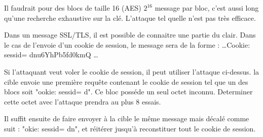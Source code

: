 Il faudrait pour des blocs de taille 16 (AES) $2^{16}$ message par bloc, c'est aussi long qu'une recherche 
exhaustive sur la clé. L'attaque tel quelle n'est pas très efficace. 

Dans un message SSL/TLS, il est possible de connaitre une partie du clair. Dans le cas de l'envoie d'un cookie de 
session, le message sera de la forme : \dots Cookie: sessid= dnu6YhPb5fd0kmQ \dots

Si l'attaquant veut voler le cookie de session, il peut utiliser l'attaque ci-dessus. la cible envoie une première
requête contenant le cookie de session tel que un des blocs soit "ookie: sessid= d". Ce bloc posséde un seul octet
inconnu. Determiner cette octet avec l'attaque prendra au plus 8 essais.

Il suffit ensuite de faire envoyer à la cible le même message mais décalé comme suit : "okie: sessid= dn", et
réitérer jusqu'à reconstituer tout le cookie de session. 



